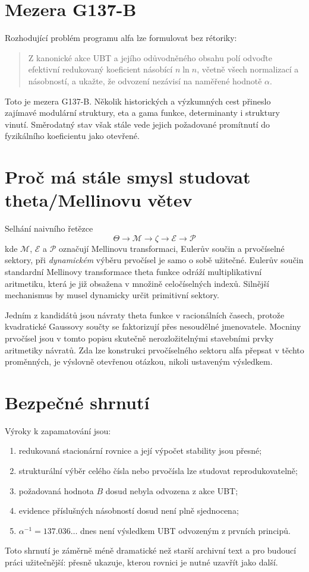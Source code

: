\section{Mezera G137-B}
Rozhodující problém programu alfa lze formulovat bez rétoriky:
\begin{quote}
Z kanonické akce UBT a jejího odůvodněného obsahu polí odvoďte efektivní
redukovaný koeficient násobící $n\ln n$, včetně všech normalizací a násobností,
a ukažte, že odvození nezávisí na naměřené hodnotě $\alpha$.
\end{quote}
Toto je mezera G137-B. Několik historických a výzkumných cest přineslo
zajímavé modulární struktury, eta a gama funkce, determinanty i struktury
vinutí. Směrodatný stav však stále vede jejich požadované promítnutí do
fyzikálního koeficientu jako otevřené.

\section{Proč má stále smysl studovat theta/Mellinovu větev}
Selhání naivního řetězce
\[
 \Theta\to\mathcal M\to\zeta\to\mathcal E\to\mathcal P
\]
kde $\mathcal M$, $\mathcal E$ a $\mathcal P$ označují Mellinovu transformaci,
Eulerův součin a prvočíselné sektory, při \emph{dynamickém} výběru prvočísel je
samo o sobě užitečné.
Eulerův součin standardní Mellinovy transformace theta funkce odráží
multiplikativní aritmetiku, která je již obsažena v množině celočíselných
indexů. Silnější mechanismus by musel dynamicky určit primitivní sektory.

Jedním z kandidátů jsou návraty theta funkce v racionálních časech, protože
kvadratické Gaussovy součty se faktorizují přes nesoudělné jmenovatele. Mocniny
prvočísel jsou v tomto popisu skutečně nerozložitelnými stavebními prvky
aritmetiky návratů. Zda lze konstrukci prvočíselného sektoru alfa přepsat v
těchto proměnných, je výslovně otevřenou otázkou, nikoli ustaveným výsledkem.

\section{Bezpečné shrnutí}
Výroky k zapamatování jsou:
\begin{enumerate}
 \item redukovaná stacionární rovnice a její výpočet stability jsou přesné;
 \item strukturální výběr celého čísla nebo prvočísla lze studovat
       reprodukovatelně;
 \item požadovaná hodnota $B$ dosud nebyla odvozena z akce UBT;
 \item evidence příslušných násobností dosud není plně sjednocena;
 \item $\alpha^{-1}=137.036\ldots$ dnes není výsledkem UBT odvozeným z prvních
       principů.
\end{enumerate}
Toto shrnutí je záměrně méně dramatické než starší archivní text a pro budoucí
práci užitečnější: přesně ukazuje, kterou rovnici je nutné uzavřít jako další.
